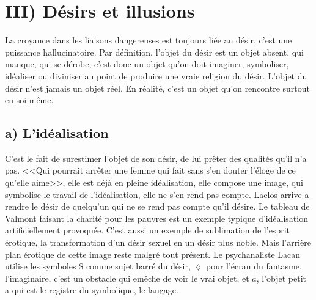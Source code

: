 \documentclass[12pt]{article}
\begin{document}
\section*{III) Désirs et illusions}
La croyance dans les liaisons dangereuses est toujours liée au désir, c'est une puissance hallucinatoire.
Par définition, l'objet du désir est un objet absent, qui manque, qui se dérobe, c'est donc un objet qu'on doit imaginer, symboliser, idéaliser ou diviniser au point de produire une vraie religion du désir.
L'objet du désir n'est jamais un objet réel. En réalité, c'est un objet qu'on rencontre surtout en soi-même.
\subsection*{a) L'idéalisation}
C'est le fait de surestimer l'objet de son désir, de lui prêter des qualités qu'il n'a pas.
<<Qui pourrait arrêter une femme qui fait sans s'en douter l'éloge de ce qu'elle aime>>, elle est déjà en pleine idéalisation, elle compose une image, qui symbolise le travail de l'idéalisation, elle ne s'en rend pas compte.
Laclos arrive a rendre le désir de quelqu'un qui ne se rend pas compte qu'il désire.
Le tableau de Valmont faisant la charité pour les pauvres est un exemple typique d'idéalisation artificiellement provoquée.
C'est aussi un exemple de sublimation de l'esprit érotique, la transformation d'un désir sexuel en un désir plus noble.
Mais l'arrière plan érotique de cette image reste malgré tout présent.
Le psychanaliste Lacan utilise les symboles $\$$ comme sujet barré du désir, $\lozenge$ pour l'écran du fantasme, l'imaginaire, c'est un obstacle qui emêche de voir le vrai objet, et $a$, l'objet petit a qui est le registre du symbolique, le langage.
\end{document}
